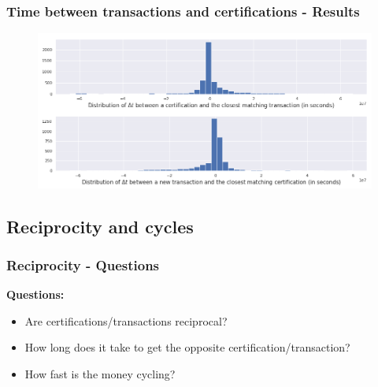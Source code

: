 \documentclass{beamer}
\begin{document}

\begin{frame}
	\frametitle{Time between transactions and certifications - \textbf{Results}}
	\begin{figure}
		\includegraphics[width=\linewidth]{./figures/delta_t_simple}
	\end{figure}
\end{frame}

\subsection{Reciprocity and cycles}

\begin{frame}
	\frametitle{Reciprocity - \textbf{Questions}}
	{\Large \textbf{Questions:}}
	\begin{itemize}
		\item<1-> Are certifications/transactions reciprocal?
		\medskip
		\item<2-> How long does it take to get the opposite certification/transaction?
		\medskip
		\item<3-> How fast is the money cycling?
	\end{itemize}
\end{frame}

\end{document}
